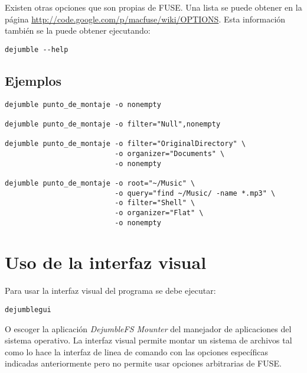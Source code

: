 Existen otras opciones que son propias de FUSE. Una lista se puede obtener en la página \url{http://code.google.com/p/macfuse/wiki/OPTIONS}. Esta información también se la puede obtener ejecutando:

\begin{verbatim}
dejumble --help
\end{verbatim}

\subsection{Ejemplos}

\begin{verbatim}
dejumble punto_de_montaje -o nonempty

dejumble punto_de_montaje -o filter="Null",nonempty

dejumble punto_de_montaje -o filter="OriginalDirectory" \
                          -o organizer="Documents" \
                          -o nonempty

dejumble punto_de_montaje -o root="~/Music" \
                          -o query="find ~/Music/ -name *.mp3" \
                          -o filter="Shell" \
                          -o organizer="Flat" \
                          -o nonempty
\end{verbatim}


\section{Uso de la interfaz visual}

Para usar la interfaz visual del programa se debe ejecutar:

\begin{verbatim}
dejumblegui
\end{verbatim}

O escoger la aplicación \textit{DejumbleFS Mounter} del manejador de aplicaciones del sistema operativo. La interfaz visual permite montar un sistema de archivos tal como lo hace la interfaz de linea de comando con las opciones específicas indicadas anteriormente pero no permite usar opciones arbitrarias de FUSE.



